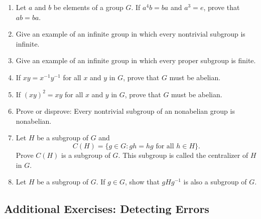 {\begin{enumerate}
 
\item
Let $a$ and $b$ be elements of a group $G$. If $a^4b=ba$ and $a^3=e$,
prove that $ab=ba$.
 
 
\item
Give an example of an infinite group in which every nontrivial
subgroup is infinite.
 
 
\item
Give an example of an infinite group in which every proper subgroup is
finite. 
 
 
\item
If $xy = x^{-1} y^{-1}$ for all $x$ and $y$ in $G$, prove that $G$
must be abelian. 
 
 
\item
If $(xy)^2 = xy$ for all $x$ and $y$ in $G$, prove that $G$ must be
abelian.
 
 
\item
Prove or disprove: Every nontrivial subgroup of an nonabelian group is
nonabelian.
 
 
\item
Let $H$ be a subgroup of $G$ and
\[
C(H) = \{ g \in G : gh = hg \mbox{ for all $h \in H$}  \}.
\]
Prove $C(H)$ is a subgroup of $G$.  This subgroup is called the {\bfi
centralizer\/} of $H$ in $G$. 


\item
Let $H$ be a subgroup of $G$.  If $g \in G$, show that $gHg^{-1}$ is also a subgroup of $G$.


 
\end{enumerate}
}
 
 
\subsection*{Additional Exercises: Detecting Errors}
 
